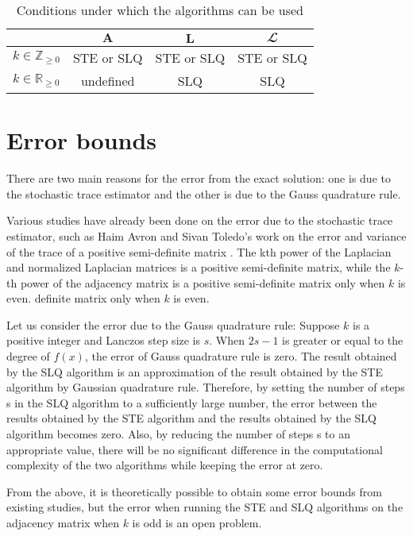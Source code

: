 \documentclass[senior,final,11pt]{iscs-thesis}
\begin{document}
\begin{table}[htb]
    \begin{center}
      \begin{tabular}{l| c c c }
       & ${\mathbf A}$ & ${\mathbf L}$ & ${\mathbfcal L}$ \\ \hline
        $k\in \mathbb{Z}_{\geq 0}$ & STE or SLQ  & STE or SLQ  & STE or SLQ \\
        $k\in \mathbb{R}_{\geq 0}$&  undefined  & SLQ  &  SLQ \\
      \end{tabular}
      \caption{Conditions under which the algorithms can be used}
      \label{tab:notion}
    \end{center}
  \end{table}

\section{Error bounds}
There are two main reasons for the error from the exact solution: one is due to the stochastic trace estimator and the other is due to the Gauss quadrature rule.

Various studies have already been done on the error due to the stochastic trace estimator, such as Haim Avron and Sivan Toledo's work on the error and variance of the trace of a positive semi-definite matrix \cite{avron2011randomized}. The kth power of the Laplacian and normalized Laplacian matrices is a positive semi-definite matrix, while the $k$-th power of the adjacency matrix is a positive semi-definite matrix only when $k$ is even. definite matrix only when $k$ is even.

Let us consider the error due to the Gauss quadrature rule: Suppose $k$ is a positive integer and Lanczos step size is $s$. When $2s-1$ is greater or equal to the degree of $f(x)$, the error of Gauss quadrature rule is zero. The result obtained by the SLQ algorithm is an approximation of the result obtained by the STE algorithm by Gaussian quadrature rule. Therefore, by setting the number of steps s in the SLQ algorithm to a sufficiently large number, the error between the results obtained by the STE algorithm and the results obtained by the SLQ algorithm becomes zero. Also, by reducing the number of steps s to an appropriate value, there will be no significant difference in the computational complexity of the two algorithms while keeping the error at zero.

From the above, it is theoretically possible to obtain some error bounds from existing studies, but the error when running the STE and SLQ algorithms on the adjacency matrix when $k$ is odd is an open problem.
\end{document}
